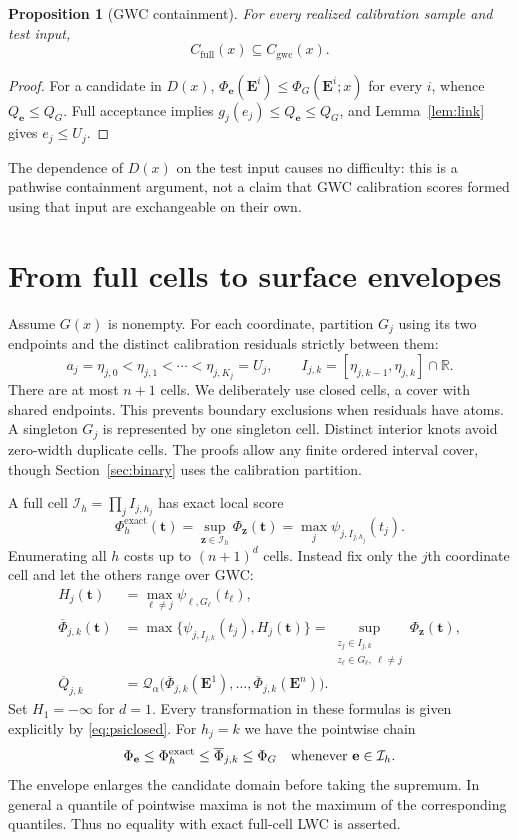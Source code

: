 \documentclass[11pt]{article}
\newtheorem{proposition}[theorem]{Proposition}
\newcommand{\R}{\mathbb R}
\newcommand{\E}{\mathbf E}
\newcommand{\tvec}{\mathbf t}
\newcommand{\zvec}{\mathbf z}
\newcommand{\evec}{\mathbf e}
\newcommand{\Q}{\mathcal Q_\alpha}
\newcommand{\Cgwc}{C_{\mathrm{gwc}}}
\begin{document}
\begin{proposition}[GWC containment]\label{prop:gwc}
For every realized calibration sample and test input,
\[C_{\mathrm{full}}(x)\subseteq\Cgwc(x).\]
\end{proposition}
\begin{proof}
For a candidate in $D(x)$, $\Phi_{\evec}(\E^i)\le\Phi_G(\E^i;x)$ for every
$i$, whence $Q_{\evec}\le Q_G$. Full acceptance implies
$g_j(e_j)\le Q_{\evec}\le Q_G$, and Lemma~\ref{lem:link} gives $e_j\le U_j$.
\end{proof}
The dependence of $D(x)$ on the test input causes no difficulty: this is a
pathwise containment argument, not a claim that GWC calibration scores formed
using that input are exchangeable on their own.

\section{From full cells to surface envelopes}
Assume $G(x)$ is nonempty. For each coordinate, partition $G_j$ using its two
endpoints and the distinct calibration residuals strictly between them:
\[
 a_j=\eta_{j,0}<\eta_{j,1}<\cdots<\eta_{j,K_j}=U_j,
 \qquad I_{j,k}=[\eta_{j,k-1},\eta_{j,k}]\cap\R.
\]
There are at most $n+1$ cells. We deliberately use closed cells, a cover with
shared endpoints. This prevents boundary exclusions when residuals have atoms.
A singleton $G_j$ is represented by one singleton cell. Distinct interior
knots avoid zero-width duplicate cells. The proofs allow any finite ordered
interval cover, though Section~\ref{sec:binary} uses the calibration partition.

A full cell $\mathcal I_h=\prod_j I_{j,h_j}$ has exact local score
\[
 \Phi_h^{\mathrm{exact}}(\tvec)=
 \sup_{\zvec\in\mathcal I_h}\Phi_{\zvec}(\tvec)
 =\max_j\psi_{j,I_{j,h_j}}(t_j).
\]
Enumerating all $h$ costs up to $(n+1)^d$ cells. Instead fix only the $j$th
coordinate cell and let the others range over GWC:
\begin{align}
 H_j(\tvec)&=\max_{\ell\ne j}\psi_{\ell,G_\ell}(t_\ell),\label{eq:H}\\
 \overline\Phi_{j,k}(\tvec)&=
 \max\{\psi_{j,I_{j,k}}(t_j),H_j(\tvec)\}
 =\sup_{\substack{z_j\in I_{j,k}\\z_\ell\in G_\ell,\ \ell\ne j}}
       \Phi_{\zvec}(\tvec),\label{eq:surface}\\
 \overline Q_{j,k}&=\Q\big(\overline\Phi_{j,k}(\E^1),\ldots,
                              \overline\Phi_{j,k}(\E^n)\big).\label{eq:surfaceq}
\end{align}
Set $H_1=-\infty$ for $d=1$. Every transformation in these formulas is given
explicitly by \eqref{eq:psiclosed}. For $h_j=k$ we have the pointwise chain
\begin{equation}\label{eq:chain}
 \Phi_{\evec}\le\Phi_h^{\mathrm{exact}}\le\overline\Phi_{j,k}\le\Phi_G
 \quad\hbox{whenever }\evec\in\mathcal I_h.
\end{equation}
The envelope enlarges the candidate domain before taking the supremum. In
general a quantile of pointwise maxima is not the maximum of the corresponding
quantiles. Thus no equality with exact full-cell LWC is asserted.
\end{document}
